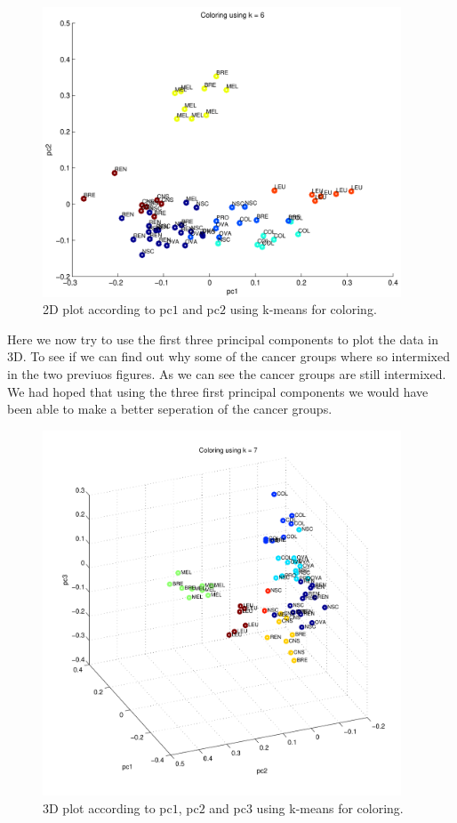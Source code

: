 \begin{figure}[!htbp]
  \centering \includegraphics[width=0.95\textwidth]{./images/q36pcs3}
  \caption{2D plot according to pc$1$ and pc$2$ using k-means for
    coloring.}
  \label{fig:q36pcs3}
\end{figure}

\newpage

Here we now try to use the first three principal components to plot
the data in 3D. To see if we can find out why some of the cancer
groups where so intermixed in the two previuos figures. As we can see
the cancer groups are still intermixed. We had hoped that using the
three first principal components we would have been able to make a
better seperation of the cancer groups.

\begin{figure}[!htbp]
  \centering \includegraphics[width=0.95\textwidth]{./images/q36pcs4}
  \caption{3D plot according to pc$1$, pc$2$ and pc$3$ using k-means
    for coloring.}
  \label{fig:q36pcs4}
\end{figure}

